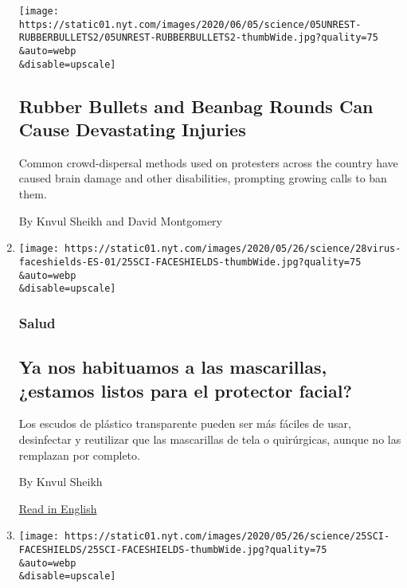\begin{enumerate}
  \texttt{[image: https://static01.nyt.com/images/2020/06/05/science/05UNREST-RUBBERBULLETS2/05UNREST-RUBBERBULLETS2-thumbWide.jpg?quality=75\\\&auto=webp\\\&disable=upscale]}

  \hypertarget{rubber-bullets-and-beanbag-rounds-can-cause-devastating-injuries}{%
  \subsection{Rubber Bullets and Beanbag Rounds Can Cause Devastating
  Injuries}\label{rubber-bullets-and-beanbag-rounds-can-cause-devastating-injuries}}

  Common crowd-dispersal methods used on protesters across the country
  have caused brain damage and other disabilities, prompting growing
  calls to ban them.

  By Knvul Sheikh and David Montgomery
\item
  \href{/es/2020/05/28/espanol/caretas-protectoras-virus.html}{}

  \texttt{[image: https://static01.nyt.com/images/2020/05/26/science/28virus-faceshields-ES-01/25SCI-FACESHIELDS-thumbWide.jpg?quality=75\\\&auto=webp\\\&disable=upscale]}

  \hypertarget{salud}{%
  \subsubsection{Salud}\label{salud}}

  \hypertarget{ya-nos-habituamos-a-las-mascarillas-estamos-listos-para-el-protector-facial}{%
  \subsection{Ya nos habituamos a las mascarillas, ¿estamos listos para
  el protector
  facial?}\label{ya-nos-habituamos-a-las-mascarillas-estamos-listos-para-el-protector-facial}}

  Los escudos de plástico transparente pueden ser más fáciles de usar,
  desinfectar y reutilizar que las mascarillas de tela o quirúrgicas,
  aunque no las remplazan por completo.

  By Knvul Sheikh

  \href{https://www.nytimes.com/2020/05/24/health/coronavirus-face-shields.html}{Read
  in English}
\item
  \href{/2020/05/24/health/coronavirus-face-shields.html}{}

  \texttt{[image: https://static01.nyt.com/images/2020/05/26/science/25SCI-FACESHIELDS/25SCI-FACESHIELDS-thumbWide.jpg?quality=75\\\&auto=webp\\\&disable=upscale]}


\end{enumerate}
